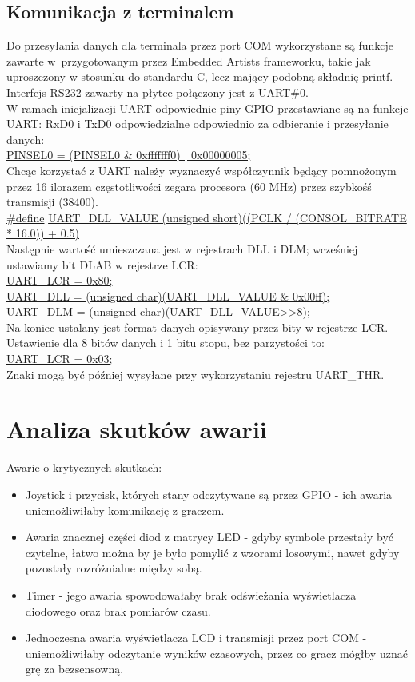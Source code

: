 \documentclass[a4paper, portrait,11pt]{article}
\begin{document}
\subsection{Komunikacja z terminalem}
Do przesyłania danych dla terminala przez port COM wykorzystane są funkcje zawarte w~przygotowanym
przez Embedded Artists frameworku, takie jak uproszczony w stosunku do standardu C, lecz
mający podobną składnię printf. Interfejs RS232 zawarty na płytce połączony jest z UART\#0.\\

W ramach inicjalizacji UART odpowiednie piny GPIO przestawiane są na funkcje UART: RxD0 i TxD0
odpowiedzialne odpowiednio za odbieranie i przesyłanie danych:\\
\url{PINSEL0 = (PINSEL0 & 0xfffffff0) | 0x00000005;}\\

Chcąc korzystać z UART należy wyznaczyć współczynnik będący pomnożonym przez 16 ilorazem
częstotliwości zegara procesora (60 MHz) przez szybkośś transmisji (38400).\\
\url{#define} \url{UART_DLL_VALUE (unsigned short)((PCLK / (CONSOL_BITRATE * 16.0)) + 0.5)}\\

Następnie wartość umieszczana jest w rejestrach DLL i DLM; wcześniej ustawiamy bit DLAB w rejestrze LCR:\\
\url{UART_LCR = 0x80;}\\
\url{UART_DLL = (unsigned char)(UART_DLL_VALUE & 0x00ff);}\\
\url{UART_DLM = (unsigned char)(UART_DLL_VALUE>>8);}\\

Na koniec ustalany jest format danych opisywany przez bity w rejestrze LCR. Ustawienie dla 8 bitów danych
i 1 bitu stopu, bez parzystości to:\\
\url{UART_LCR = 0x03;}\\

Znaki mogą być później wysyłane przy wykorzystaniu rejestru UART\_THR.

\section{Analiza skutków awarii}
Awarie o krytycznych skutkach:
\begin{itemize}
\item Joystick i przycisk, których stany odczytywane są przez GPIO
- ich awaria uniemożliwiłaby komunikację z graczem.
\item Awaria znacznej części diod z matrycy LED - gdyby symbole
przestały być czytelne, łatwo można by je było pomylić z wzorami
losowymi, nawet gdyby pozostały rozróżnialne między sobą.
\item Timer - jego awaria spowodowałaby brak odświeżania wyświetlacza
diodowego oraz brak pomiarów czasu.
\item Jednoczesna awaria wyświetlacza LCD i transmisji przez
port COM - uniemożliwiłaby odczytanie wyników czasowych, przez
co gracz mógłby uznać grę za bezsensowną.
\end{itemize}\ \\
\end{document}

